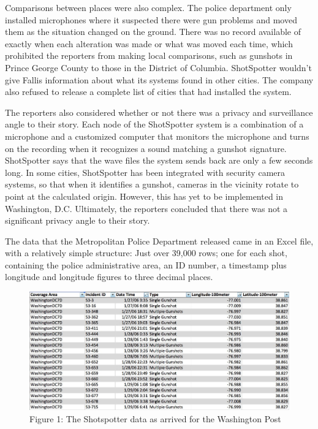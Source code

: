 Comparisons between places were also complex. The police department
only installed microphones where it suspected there were gun problems and
moved them as the situation changed on the ground. There was no record
available of exactly when each alteration was made or what was moved each
time, which prohibited the reporters from making local comparisons, such
as gunshots in Prince George County to those in the District of Columbia.
ShotSpotter wouldn't give Fallis information about what its systems found
in other cities. The company also refused to release a complete list of cities
that had installed the system.

The reporters also considered whether or not there was a privacy and surveillance
angle to their story. Each node of the ShotSpotter system is a
combination of a microphone and a customized computer that monitors
the microphone and turns on the recording when it recognizes a sound
matching a gunshot signature. ShotSpotter says that the wave files the system
sends back are only a few seconds long. In some cities, ShotSpotter
has been integrated with security camera systems, so that when it identifies
a gunshot, cameras in the vicinity rotate to point at the calculated origin.
However, this has yet to be implemented in Washington, D.C. Ultimately,
the reporters concluded that there was not a significant privacy angle to
their story.

The data that the Metropolitan Police Department released came in an
Excel file, with a relatively simple structure: Just over 39,000 rows; one for
each shot, containing the police administrative area, an ID number, a timestamp
plus longitude and longitude figures to three decimal places.

    \begin{figure}
    \includegraphics{images/WashingtonPostShapeofData.jpg}
    \caption{Figure 1: The Shotspotter data as arrived for the Washington Post}
    \end{figure}



